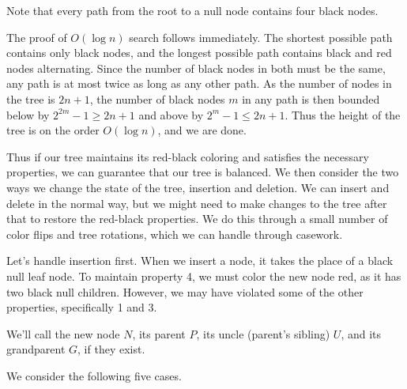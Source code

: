 
Note that every path from the root to a null node contains four black nodes.

The proof of $O(\log{n})$ search follows immediately. The shortest possible path contains only black nodes, and the longest possible path contains black and red nodes alternating. Since the number of black nodes in both must be the same, any path is at most twice as long as any other path. As the number of nodes in the tree is $2n+1$, the number of black nodes $m$ in any path is then bounded below by $2^{2m} - 1 \ge 2n + 1$ and above by $2^{m} - 1 \le 2n + 1$. Thus the height of the tree is on the order $O(\log{n})$, and we are done.

Thus if our tree maintains its red-black coloring and satisfies the necessary properties, we can guarantee that our tree is balanced. We then consider the two ways we change the state of the tree, insertion and deletion. We can insert and delete in the normal way, but we might need to make changes to the tree after that to restore the red-black properties. We do this through a small number of color flips and tree rotations, which we can handle through casework.

Let's handle insertion first. When we insert a node, it takes the place of a black null leaf node. To maintain property 4, we must color the new node red, as it has two black null children. However, we may have violated some of the other properties, specifically 1 and 3.

We'll call the new node $N$, its parent $P$, its uncle (parent's sibling) $U$, and its grandparent $G$, if they exist.

We consider the following five cases.

